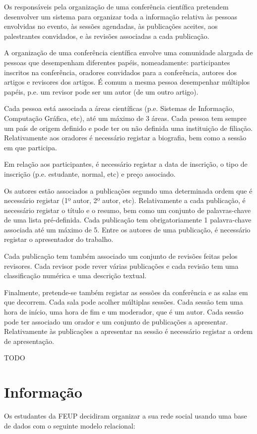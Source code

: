 {Os responsáveis pela organização de uma conferência científica pretendem desenvolver um sistema para organizar toda a informação relativa às pessoas envolvidas no evento, às sessões agendadas, às publicações aceites, aos palestrantes convidados, e às revisões associadas a cada publicação.

A organização de uma conferência científica envolve uma comunidade alargada de pessoas que desempenham diferentes papéis, nomeadamente: participantes inscritos na conferência, oradores convidados para a conferência, autores dos artigos e revisores dos artigos. É comum a mesma pessoa desempenhar múltiplos papéis, p.e. um revisor pode ser um autor (de um outro artigo).

Cada pessoa está associada a áreas científicas (p.e. Sistemas de Informação, Computação Gráfica, etc), até um máximo de 3 áreas. Cada pessoa tem sempre um país de origem definido e pode ter ou não definida uma instituição de filiação. Relativamente aos oradores é necessário registar a biografia, bem como a sessão em que participa.

Em relação aos participantes, é necessário registar a data de inscrição, o tipo de inscrição (p.e. estudante, normal, etc) e preço associado.

Os autores estão associados a publicações segundo uma determinada ordem que é necessário registar (1º autor, 2º autor, etc). Relativamente a cada publicação, é necessário registar o título e o resumo, bem como um conjunto de palavras-chave de uma lista pré-definida. Cada publicação tem obrigatoriamente 1 palavra-chave associada até um máximo de 5. Entre os autores de uma publicação, é necessário registar o apresentador do trabalho.

Cada publicação tem também associado um conjunto de revisões feitas pelos revisores. Cada revisor pode rever várias publicações e cada revisão tem uma classificação numérica e uma descrição textual.

Finalmente, pretende-se também registar as sessões da conferência e as salas em que decorrem. Cada sala pode acolher múltiplas sessões. Cada sessão tem uma hora de início, uma hora de fim e um moderador, que é um autor. Cada sessão pode ter associado um orador e um conjunto de publicações a apresentar. Relativamente às publicações a apresentar na sessão é necessário registar a ordem de apresentação.

\ansseparator

TODO

\section*{Informação}
Os estudantes da FEUP decidiram organizar a sua rede social usando uma base de dados com o seguinte modelo relacional:

}

